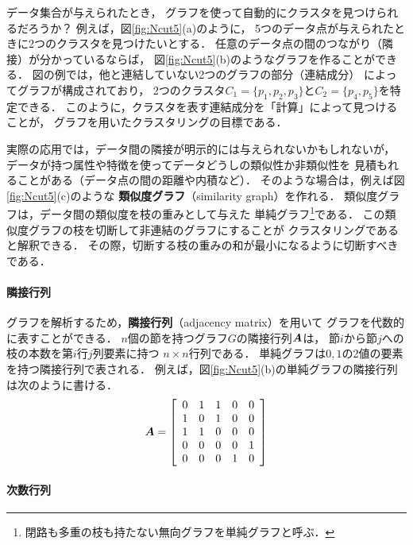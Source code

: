 データ集合が与えられたとき，
グラフを使って自動的にクラスタを見つけられるだろうか？
例えば，図\ref{fig:Ncut5}(a)のように，
5つのデータ点が与えられたときに2つのクラスタを見つけたいとする．
任意のデータ点の間のつながり（隣接）が分かっているならば，
図\ref{fig:Ncut5}(b)のようなグラフを作ることができる．
図の例では，他と連結していない2つのグラフの部分（連結成分）
によってグラフが構成されており，
2つのクラスタ$C_1=\{p_1,p_2,p_3\}$と$C_2=\{p_4,p_5\}$を特定できる．
このように，クラスタを表す連結成分を「計算」によって見つけることが，
グラフを用いたクラスタリングの目標である．

実際の応用では，データ間の隣接が明示的には与えられないかもしれないが，
データが持つ属性や特徴を使ってデータどうしの類似性か非類似性を
見積もれることがある（データ点の間の距離や内積など）．
そのような場合は，例えば図\ref{fig:Ncut5}(c)のような
{\bf 類似度グラフ}（similarity graph）を作れる．
類似度グラフは，データ間の類似度を枝の重みとして与えた
単純グラフ\footnote{%
閉路も多重の枝も持たない無向グラフを単純グラフと呼ぶ．}である．
この類似度グラフの枝を切断して非連結のグラフにすることが
クラスタリングであると解釈できる．
その際，切断する枝の重みの和が最小になるように切断すべきである．





\paragraph{隣接行列}
グラフを解析するため，{\bf 隣接行列}（adjacency matrix）を用いて
グラフを代数的に表すことができる．
$n$個の節を持つグラフ$G$の隣接行列$\mtr A$は，
節$i$から節$j$への枝の本数を第$i$行$j$列要素に持つ
$n\times n$行列である．
単純グラフは${0,1}$の2値の要素を持つ隣接行列で表される．
例えば，図\ref{fig:Ncut5}(b)の単純グラフの隣接行列は次のように書ける．
\begin{equation}
\mtr A=\smatrix{\normalsize}{ccccc}
{
0 & 1 & 1 & 0 & 0\\
1 & 0 & 1 & 0 & 0\\
1 & 1 & 0 & 0 & 0\\
0 & 0 & 0 & 0 & 1\\
0 & 0 & 0 & 1 & 0}
\end{equation}

\paragraph{次数行列}


